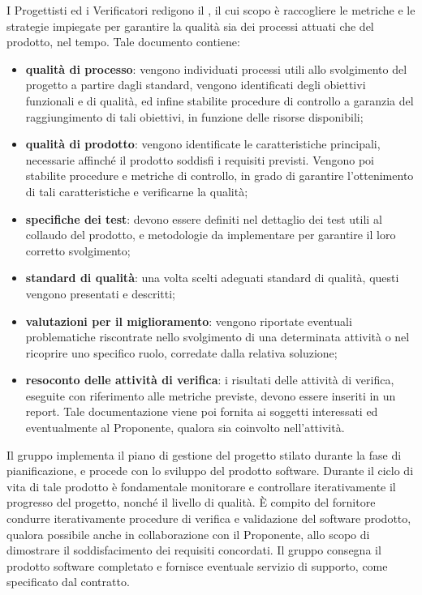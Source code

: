     I Progettisti ed i Verificatori redigono il \PdQ{}, il cui scopo è raccogliere le metriche e le strategie impiegate per garantire la qualità sia dei processi attuati che del prodotto, nel tempo. Tale documento contiene:
    \begin{itemize}
       		\item{\textbf{qualità di processo}: vengono individuati processi utili allo svolgimento del progetto a partire dagli standard, vengono identificati degli obiettivi funzionali e di qualità, ed infine stabilite procedure di controllo a garanzia del raggiungimento di tali obiettivi, in funzione delle risorse disponibili;}
       		\item{\textbf{qualità di prodotto}: vengono identificate le caratteristiche principali, necessarie affinché il prodotto soddisfi i requisiti previsti. Vengono poi stabilite procedure e metriche di controllo, in grado di garantire l'ottenimento di tali caratteristiche e verificarne la qualità;}
       		\item{\textbf{specifiche dei test}: devono essere definiti nel dettaglio dei test utili al collaudo del prodotto, e metodologie da implementare per garantire il loro corretto svolgimento;}
       		\item{\textbf{standard di qualità}: una volta scelti adeguati standard di qualità, questi vengono presentati e descritti;}
       		\item{\textbf{valutazioni per il miglioramento}: vengono riportate eventuali problematiche riscontrate nello svolgimento di una determinata attività o nel ricoprire uno specifico ruolo, corredate dalla relativa soluzione;}
       		\item{\textbf{resoconto delle attività di verifica}: i risultati delle attività di verifica, eseguite con riferimento alle metriche previste, devono essere inseriti in un report. Tale documentazione viene poi fornita ai soggetti interessati ed eventualmente al Proponente, qualora sia coinvolto nell'attività.}
    \end{itemize}   
    Il gruppo implementa il piano di gestione del progetto stilato durante la fase di pianificazione, e procede con lo sviluppo del prodotto software. Durante il ciclo di vita di tale prodotto è fondamentale monitorare e controllare iterativamente il progresso del progetto, nonché il livello di qualità.
    È compito del fornitore condurre iterativamente procedure di verifica e validazione del software prodotto, qualora possibile anche in collaborazione con il Proponente, allo scopo di dimostrare il soddisfacimento dei requisiti concordati.
    Il gruppo consegna il prodotto software completato e fornisce eventuale servizio di supporto, come specificato dal contratto.
